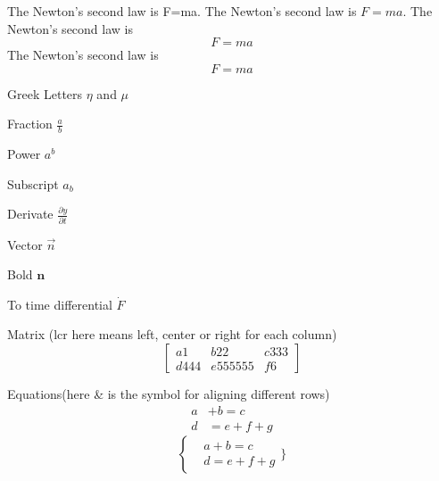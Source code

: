 \documentclass{article}
\begin{document}
     
	The Newton's second law is F=ma.       
	The Newton's second law is $F=ma$.  
    	The Newton's second law is    $$F=ma$$       
	The Newton's second law is    \[F=ma\]


	Greek Letters $\eta$ and $\mu$       
	
Fraction $\frac{a}{b}$       
	
Power $a^b$       
	
Subscript $a_b$       
	
Derivate $\frac{\partial y}{\partial t} $       
	
Vector $\vec{n}$       
	
Bold $\mathbf{n}$       
	
To time differential $\dot{F}$


Matrix (lcr here means left, center or right for each column)    
\[       
\left[         
\begin{array}{lcr}          
a1 & b22 & c333 \\          
d444 & e555555 & f6        
\end{array}      
\right]    
\] 



Equations(here \& is the symbol for aligning different rows)  
\begin{align}    
a&+b=c\\   
 d&=e+f+g  
\end{align}     
\[     
\left
\{       
\begin{aligned}        
&a+b=c\\        
&d=e+f+g  
    \end{aligned}   
\}
 \right. 
\] 
 
\end{document}
